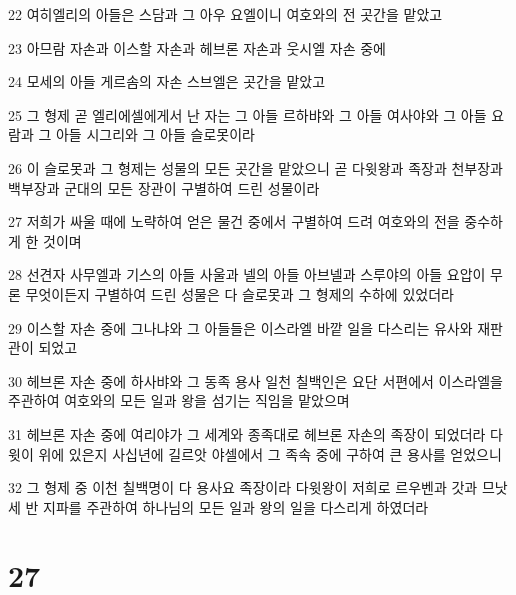 \par 22 여히엘리의 아들은 스담과 그 아우 요엘이니 여호와의 전 곳간을 맡았고
\par 23 아므람 자손과 이스할 자손과 헤브론 자손과 웃시엘 자손 중에
\par 24 모세의 아들 게르솜의 자손 스브엘은 곳간을 맡았고
\par 25 그 형제 곧 엘리에셀에게서 난 자는 그 아들 르하뱌와 그 아들 여사야와 그 아들 요람과 그 아들 시그리와 그 아들 슬로못이라
\par 26 이 슬로못과 그 형제는 성물의 모든 곳간을 맡았으니 곧 다윗왕과 족장과 천부장과 백부장과 군대의 모든 장관이 구별하여 드린 성물이라
\par 27 저희가 싸울 때에 노략하여 얻은 물건 중에서 구별하여 드려 여호와의 전을 중수하게 한 것이며
\par 28 선견자 사무엘과 기스의 아들 사울과 넬의 아들 아브넬과 스루야의 아들 요압이 무론 무엇이든지 구별하여 드린 성물은 다 슬로못과 그 형제의 수하에 있었더라
\par 29 이스할 자손 중에 그나냐와 그 아들들은 이스라엘 바깥 일을 다스리는 유사와 재판관이 되었고
\par 30 헤브론 자손 중에 하사뱌와 그 동족 용사 일천 칠백인은 요단 서편에서 이스라엘을 주관하여 여호와의 모든 일과 왕을 섬기는 직임을 맡았으며
\par 31 헤브론 자손 중에 여리야가 그 세계와 종족대로 헤브론 자손의 족장이 되었더라 다윗이 위에 있은지 사십년에 길르앗 야셀에서 그 족속 중에 구하여 큰 용사를 얻었으니
\par 32 그 형제 중 이천 칠백명이 다 용사요 족장이라 다윗왕이 저희로 르우벤과 갓과 므낫세 반 지파를 주관하여 하나님의 모든 일과 왕의 일을 다스리게 하였더라

\chapter{27}

